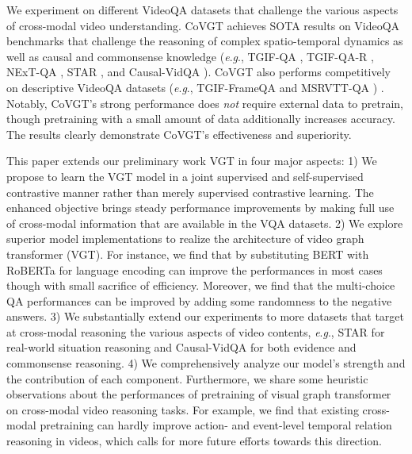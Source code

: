 \documentclass[10pt,journal,compsoc]{IEEEtran}
\newcommand{\eg}{\textit{e}.\textit{g}.}
\begin{document}
We experiment on different VideoQA datasets that challenge the various aspects of cross-modal video understanding.
CoVGT achieves SOTA results on VideoQA benchmarks 
that challenge the reasoning of complex spatio-temporal dynamics as well as causal and commonsense knowledge
(\eg, TGIF-QA \cite{jang2017tgif}, TGIF-QA-R \cite{peng2021progressive}, NExT-QA \cite{xiao2021next}, STAR \cite{wu2021star}, and Causal-VidQA \cite{li2022representation}).
CoVGT also performs competitively on descriptive VideoQA datasets (\eg, TGIF-FrameQA\cite{jang2017tgif} and MSRVTT-QA \cite{xu2017video}) .  Notably, CoVGT's strong performance
does \emph{not} require external data to pretrain, though pretraining with a small amount of data additionally increases accuracy. The results clearly demonstrate CoVGT's effectiveness and superiority. 

This paper extends our preliminary work VGT \cite{xiao2022video} in four major aspects: 1) We propose to learn the VGT model in a joint supervised and self-supervised contrastive manner rather than merely supervised contrastive learning. The enhanced objective brings steady performance improvements by making full use of cross-modal information that are available in the VQA datasets. 2) We explore superior model implementations to realize the architecture of video graph transformer (VGT). For instance, we find that by substituting BERT \cite{devlin2018bert} with RoBERTa \cite{liu2019roberta} for language encoding can improve the performances in most cases though with small sacrifice of efficiency. Moreover, we find that the multi-choice QA performances can be improved by adding some randomness to the negative answers. 3) We substantially extend our experiments to more datasets that target at cross-modal reasoning the various aspects of video contents, \eg, STAR \cite{wu2021star} for real-world situation reasoning and Causal-VidQA \cite{li2022representation} for both evidence and commonsense reasoning. 4) We comprehensively analyze our model's strength and the contribution of each component. Furthermore, we share some heuristic observations about the performances of pretraining of visual graph transformer on cross-modal video reasoning tasks. For example, we find that existing cross-modal pretraining can hardly improve action- and event-level temporal relation reasoning in videos, which calls for more future efforts towards this direction.
\end{document}
